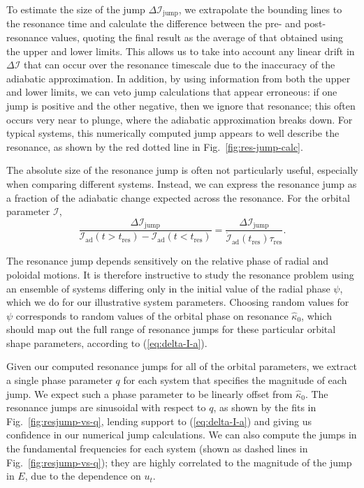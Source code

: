 \documentclass[aps,prd,amsfonts,amssymb,amsmath,nofootinbib,reprint,showpacs,superscriptaddress,twocolumn]{revtex4}
\newcommand{\eqnref}[1]{(\ref{eq:#1})}
\newcommand{\figref}[1]{Fig.\ \ref{fig:#1}}
\begin{document}
To estimate the size of the jump $\Delta \mathcal{I}_{\mathrm{jump}}$, we extrapolate the bounding lines to the resonance time and calculate the difference between the pre- and post-resonance values, quoting the final result as the average of that obtained using the upper and lower limits. This allows us to take into account any linear drift in $\Delta \mathcal{I}$ that can occur over the resonance timescale due to the inaccuracy of the adiabatic approximation. In addition, by using information from both the upper and lower limits, we can veto jump calculations that appear erroneous: if one jump is positive and the other negative, then we ignore that resonance; this often occurs very near to plunge, where the adiabatic approximation breaks down. For typical systems, this numerically computed jump appears to well describe the resonance, as shown by the red dotted line in \figref{res-jump-calc}.

The absolute size of the resonance jump is often not particularly useful, especially when comparing different systems. Instead, we can express the resonance jump as a fraction of the adiabatic change expected across the resonance. For the orbital parameter $\mathcal{I}$,
\begin{equation}
\label{eq:res-jump-ratio}
\frac{\Delta \mathcal{I}_\mathrm{jump}}{\mathcal{I}_\mathrm{ad}(t>t_\mathrm{res})-\mathcal{I}_\mathrm{ad}(t<t_\mathrm{res})} = \frac{\Delta \mathcal{I}_\mathrm{jump}}{\dot{\mathcal{I}}_\mathrm{ad}(t_\mathrm{res})\tau_\mathrm{res}}.
\end{equation}

The resonance jump depends sensitively on the relative phase of radial and poloidal motions. It is therefore instructive to study the resonance problem using an ensemble of systems differing only in the initial value of the radial phase $\psi$, which we do for our illustrative system parameters. Choosing random values for $\psi$ corresponds to random values of the orbital phase on resonance $\widehat{\kappa}_0$, which should map out the full range of resonance jumps for these particular orbital shape parameters, according to \eqnref{delta-I-a}.

Given our computed resonance jumps for all of the orbital parameters, we extract a single phase parameter $q$ for each system that specifies the magnitude of each jump. We expect such a phase parameter to be linearly offset from $\widehat{\kappa}_0$. The resonance jumps are sinusoidal with respect to $q$, as shown by the fits in \figref{resjump-vs-q}, lending support to \eqnref{delta-I-a} and giving us confidence in our numerical jump calculations. We can also compute the jumps in the fundamental frequencies for each system (shown as dashed lines in \figref{resjump-vs-q}); they are highly correlated to the magnitude of the jump in $E$, due to the dependence on $u_t$.
\end{document}
